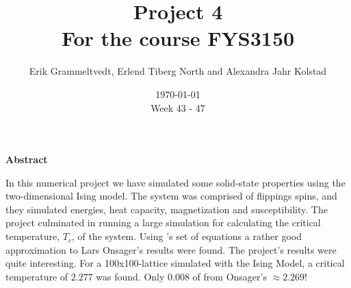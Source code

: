 \documentclass{article}
\begin{document}
\addtocounter{page}{0}

\title{Project 4 \\
      \large For the course FYS3150}
\date{\today \\
    \vspace{1mm}
    \large Week 43 - 47}

\author{Erik Grammeltvedt, Erlend Tiberg North and Alexandra Jahr Kolstad}

\maketitle






\vspace{1cm}


\begin{center}

{\Large\textbf{Abstract}} \label{sec:Abstract}

\end{center}

In this numerical project we have simulated some solid-state properties using the two-dimensional Ising model. The system was comprised of flippings spins, and they simulated energies, heat capacity, magnetization and susceptibility. The project culminated in running a large simulation for calculating the critical temperature, $T_c$, of the system. Using \cite{task}'s set of equations a rather good approximation to Lars Onsager's \cite{onsager} results were found. The project's results were quite interesting. For a 100x100-lattice simulated with the Ising Model, a critical temperature of $2.277$ was found. Only $0.008$ of from Onsager's $\approx 2.269$!

\newpage


\vspace{1cm}

\tableofcontents

\vspace{1cm}

\vspace{1cm}
\end{document}
